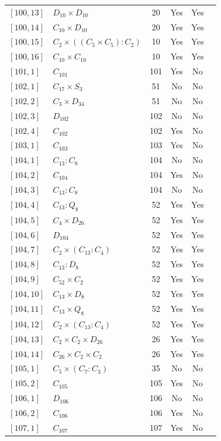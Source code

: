 \documentclass[12pt, a4paper]{article}
\theoremstyle{plain}
\theoremstyle{definition}
\begin{document}
\begin{longtable}{llcccl}
  $[100,13]$ & $D_{10} \times D_{10}$ & 20 & Yes & Yes \\
  $[100,14]$ & $C_{10} \times D_{10}$ & 20 & Yes & Yes \\
  $[100,15]$ & $C_2 \times ((C_5 \times C_5) : C_2)$ & 10 & Yes & Yes \\
  $[100,16]$ & $C_{10} \times C_{10}$ & 10 & Yes & Yes \\
  $[101,1]$ & $C_{101}$ & 101 & Yes & No \\
  $[102,1]$ & $C_{17} \times S_3$ & 51 & No & No \\
  $[102,2]$ & $C_3 \times D_{34}$ & 51 & No & No \\
  $[102,3]$ & $D_{102}$ & 102 & No & No \\
  $[102,4]$ & $C_{102}$ & 102 & Yes & No \\
  $[103,1]$ & $C_{103}$ & 103 & Yes & No \\
  $[104,1]$ & $C_{13} : C_8$ & 104 & No & No \\
  $[104,2]$ & $C_{104}$ & 104 & Yes & No \\
  $[104,3]$ & $C_{13} : C_8$ & 104 & No & No \\
  $[104,4]$ & $C_{13} : Q_8$ & 52 & Yes & Yes \\
  $[104,5]$ & $C_4 \times D_{26}$ & 52 & Yes & Yes \\
  $[104,6]$ & $D_{104}$ & 52 & Yes & Yes \\
  $[104,7]$ & $C_2 \times (C_{13} : C_4)$ & 52 & Yes & Yes \\
  $[104,8]$ & $C_{13} : D_8$ & 52 & Yes & Yes \\
  $[104,9]$ & $C_{52} \times C_2$ & 52 & Yes & Yes \\
  $[104,10]$ & $C_{13} \times D_8$ & 52 & Yes & Yes \\
  $[104,11]$ & $C_{13} \times Q_8$ & 52 & Yes & Yes \\
  $[104,12]$ & $C_2 \times (C_{13} : C_4)$ & 52 & Yes & Yes \\
  $[104,13]$ & $C_2 \times C_2 \times D_{26}$ & 26 & Yes & Yes \\
  $[104,14]$ & $C_{26} \times C_2 \times C_2$ & 26 & Yes & Yes \\
  $[105,1]$ & $C_5 \times (C_7 : C_3)$ & 35 & No & No \\
  $[105,2]$ & $C_{105}$ & 105 & Yes & No \\
  $[106,1]$ & $D_{106}$ & 106 & No & No \\
  $[106,2]$ & $C_{106}$ & 106 & Yes & No \\
  $[107,1]$ & $C_{107}$ & 107 & Yes & No \\

\end{longtable}
\end{document}

